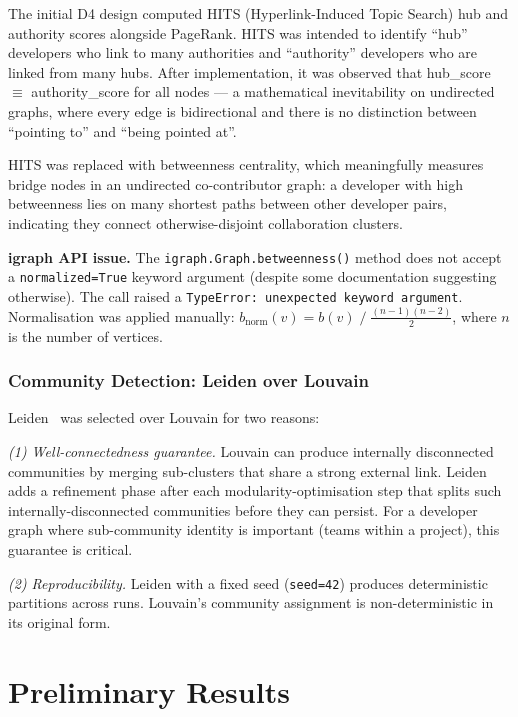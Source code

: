 \documentclass[conference]{IEEEtran}
\begin{document}
The initial D4 design computed HITS (Hyperlink-Induced Topic Search) hub
and authority scores alongside PageRank. HITS was intended to identify
``hub'' developers who link to many authorities and ``authority'' developers
who are linked from many hubs. After implementation, it was observed that
hub\_score $\equiv$ authority\_score for all nodes — a mathematical
inevitability on undirected graphs, where every edge is bidirectional and
there is no distinction between ``pointing to'' and ``being pointed at''.

HITS was replaced with betweenness centrality, which meaningfully measures
bridge nodes in an undirected co-contributor graph: a developer with high
betweenness lies on many shortest paths between other developer pairs,
indicating they connect otherwise-disjoint collaboration clusters.

\textbf{igraph API issue.} The \texttt{igraph.Graph.betweenness()} method
does not accept a \texttt{normalized=True} keyword argument (despite some
documentation suggesting otherwise). The call raised a \texttt{TypeError:
unexpected keyword argument}. Normalisation was applied manually:
$b_{\text{norm}}(v) = b(v) \;/\; \tfrac{(n-1)(n-2)}{2}$, where $n$ is the
number of vertices.

\subsubsection{Community Detection: Leiden over Louvain}

Leiden~\cite{traag2019leiden} was selected over Louvain for two reasons:

\textit{(1) Well-connectedness guarantee.} Louvain can produce internally
disconnected communities by merging sub-clusters that share a strong external
link. Leiden adds a refinement phase after each modularity-optimisation step
that splits such internally-disconnected communities before they can persist.
For a developer graph where sub-community identity is important (teams
within a project), this guarantee is critical.

\textit{(2) Reproducibility.} Leiden with a fixed seed (\texttt{seed=42})
produces deterministic partitions across runs. Louvain's community assignment
is non-deterministic in its original form.

\section{Preliminary Results}
\end{document}
